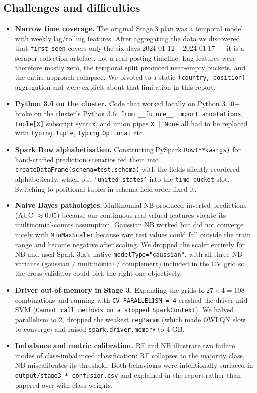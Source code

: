\documentclass[11pt,a4paper]{article}
\begin{document}
\subsection{Challenges and difficulties}
\begin{itemize}[leftmargin=*]
  \item \textbf{Narrow time coverage.}  The original Stage 3 plan was
    a temporal model with weekly lag/rolling features.  After
    aggregating the data we discovered that \texttt{first\_seen}
    covers only the six days 2024-01-12 -- 2024-01-17 --- it is a
    scraper-collection artefact, not a real posting timeline.  Lag
    features were therefore mostly zero, the temporal split produced
    near-empty buckets, and the entire approach collapsed.  We pivoted
    to a static \texttt{(country, position)} aggregation and were
    explicit about that limitation in this report.
  \item \textbf{Python 3.6 on the cluster.}  Code that worked locally
    on Python 3.10+ broke on the cluster's Python 3.6: \texttt{from
    \_\_future\_\_ import annotations}, \texttt{tuple[X]} subscript
    syntax, and union pipes \texttt{X | None} all had to be replaced
    with \texttt{typing.Tuple}, \texttt{typing.Optional} etc.
  \item \textbf{Spark Row alphabetisation.}  Constructing PySpark
    \texttt{Row(**kwargs)} for hand-crafted prediction scenarios fed
    them into \texttt{createDataFrame(schema=test.schema)} with the
    fields silently reordered alphabetically, which put
    \texttt{'united states'} into the \texttt{time\_bucket} slot.
    Switching to positional tuples in schema-field order fixed it.
  \item \textbf{Naive Bayes pathologies.}  Multinomial NB produced
    inverted predictions (AUC $\approx 0.05$) because our continuous
    real-valued features violate its multinomial-counts assumption.
    Gaussian NB worked but did not converge nicely with
    \texttt{MinMaxScaler} because rare test values could fall outside
    the train range and become negative after scaling.  We dropped
    the scaler entirely for NB and used Spark 3.x's native
    \texttt{modelType="gaussian"}, with all three NB variants
    (gaussian / multinomial / complement) included in the CV grid so
    the cross-validator could pick the right one objectively.
  \item \textbf{Driver out-of-memory in Stage 3.}  Expanding the
    grids to $27 \times 4 = 108$ combinations and running with
    \texttt{CV\_PARALLELISM = 4} crashed the driver mid-SVM
    (\texttt{Cannot call methods on a stopped SparkContext}).  We
    halved parallelism to 2, dropped the weakest \texttt{regParam}
    (which made OWLQN slow to converge) and raised
    \texttt{spark.driver.memory} to 4 GB.
  \item \textbf{Imbalance and metric calibration.}  RF and NB
    illustrate two failure modes of class-imbalanced classification:
    RF collapses to the majority class, NB miscalibrates its
    threshold.  Both behaviours were intentionally surfaced in
    \texttt{output/stage3\_*\_confusion.csv} and explained in the
    report rather than papered over with class weights.
\end{itemize}
\end{document}

